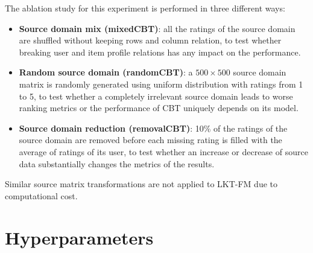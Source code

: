 The ablation study for this experiment is performed in three different ways:
\begin{itemize}
\item \textbf{Source domain mix (mixedCBT)}: all the ratings of the source domain are shuffled without keeping rows and column relation, to test whether breaking user and item profile relations has any impact on the performance.
\item \textbf{Random source domain (randomCBT)}: a $500 \times 500$ source domain matrix is randomly generated using uniform distribution with ratings from 1 to 5, to test whether a completely irrelevant source domain leads to worse ranking metrics or the performance of CBT uniquely depends on its model.
\item \textbf{Source domain reduction (removalCBT)}: 10\% of the ratings of the source domain are removed before each missing rating is filled with the average of ratings of its user, to test whether an increase or decrease of source data substantially changes the metrics of the results.
\end{itemize}
Similar source matrix transformations are not applied to LKT-FM due to computational cost.



\section{Hyperparameters}

